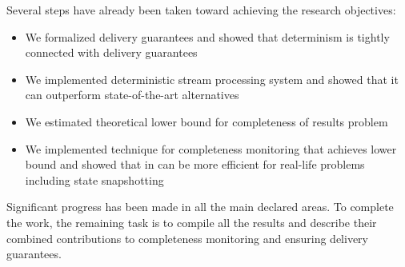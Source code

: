 Several steps have already been taken toward achieving the research objectives:

\begin{itemize}
\item We formalized delivery guarantees and showed that determinism is tightly connected with delivery guarantees~\cite{thepaper, we2018seim, trofimov2018consistency}
\item We implemented deterministic stream processing system and showed that it can outperform state-of-the-art alternatives~\cite{we2018adbis, we2018beyondmr, webirte}
\item We estimated theoretical lower bound for completeness of results problem~\cite{10.1145/3524860.3539809, trofimov2023bounding}
\item We implemented technique for completeness monitoring that achieves lower bound and showed that in can be more efficient for real-life problems including state snapshotting~\cite{10.1145/3524860.3539809, trofimov2023bounding}
\end{itemize}

Significant progress has been made in all the main declared areas. To complete the work, the remaining task is to compile all the results and describe their combined contributions to completeness monitoring and ensuring delivery guarantees.